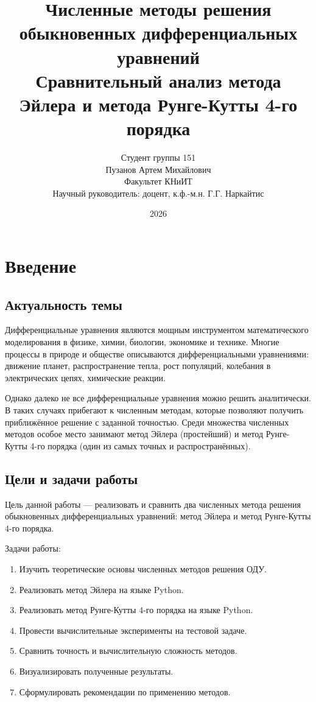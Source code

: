 \documentclass[a4paper,12pt]{article}
\title{Численные методы решения обыкновенных дифференциальных уравнений\\
\large{Сравнительный анализ метода Эйлера и метода Рунге-Кутты 4-го порядка}}
\author{Студент группы 151\\
Пузанов Артем Михайлович\\
Факультет КНиИТ\\
Научный руководитель: доцент, к.ф.-м.н. Г.Г. Наркайтис}
\date{2026}
\begin{document}
\maketitle
\newpage

\tableofcontents
\newpage

\section*{Введение}

\subsection*{Актуальность темы}
Дифференциальные уравнения являются мощным инструментом математического моделирования в физике, химии, биологии, экономике и технике. Многие процессы в природе и обществе описываются дифференциальными уравнениями: движение планет, распространение тепла, рост популяций, колебания в электрических цепях, химические реакции.

Однако далеко не все дифференциальные уравнения можно решить аналитически. В таких случаях прибегают к численным методам, которые позволяют получить приближённое решение с заданной точностью. Среди множества численных методов особое место занимают метод Эйлера (простейший) и метод Рунге-Кутты 4-го порядка (один из самых точных и распространённых).

\subsection*{Цели и задачи работы}
Цель данной работы — реализовать и сравнить два численных метода решения обыкновенных дифференциальных уравнений: метод Эйлера и метод Рунге-Кутты 4-го порядка.

Задачи работы:
\begin{enumerate}
    \item Изучить теоретические основы численных методов решения ОДУ.
    \item Реализовать метод Эйлера на языке Python.
    \item Реализовать метод Рунге-Кутты 4-го порядка на языке Python.
    \item Провести вычислительные эксперименты на тестовой задаче.
    \item Сравнить точность и вычислительную сложность методов.
    \item Визуализировать полученные результаты.
    \item Сформулировать рекомендации по применению методов.
\end{enumerate}
\end{document}
